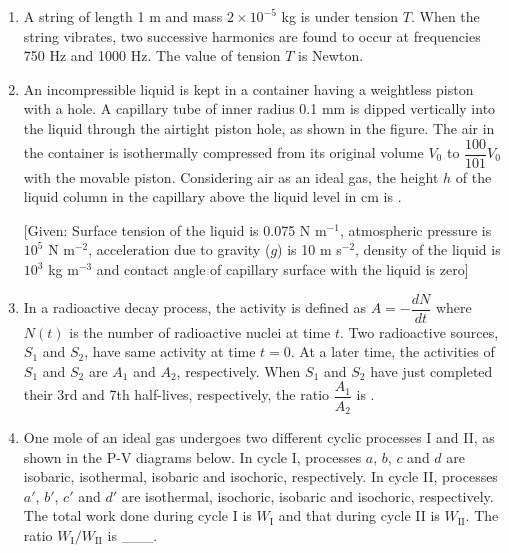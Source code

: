 \documentclass{article}
\renewcommand{\frac}[2]{\dfrac{#1}{#2}}
\begin{document}
\begin{enumerate}
    \item A string of length 1 m and mass \( 2 \times 10^{-5} \) kg is under tension \( T \). When the string vibrates, two successive harmonics are found to occur at frequencies 750 Hz and 1000 Hz. The value of tension \( T \) is \underline{\hspace{2cm}} Newton.
    \item An incompressible liquid is kept in a container having a weightless piston with a hole. A capillary tube of inner radius 0.1 mm is dipped vertically into the liquid through the airtight piston hole, as shown in the figure. The air in the container is isothermally compressed from its original volume \( V_0 \) to \( \frac{100}{101}V_0 \) with the movable piston. Considering air as an ideal gas, the height \( h \) of the liquid column in the capillary above the liquid level in cm is \underline{\hspace{2cm}}.

    \begin{center}
    \end{center}

    [Given: Surface tension of the liquid is 0.075 N m\(^{-1}\), atmospheric pressure is \( 10^5 \) N m\(^{-2}\), acceleration due to gravity (\( g \)) is 10 m s\(^{-2}\), density of the liquid is \( 10^3 \) kg m\(^{-3}\) and contact angle of capillary surface with the liquid is zero]
    \item In a radioactive decay process, the activity is defined as \( A = -\frac{dN}{dt} \) where \( N(t) \) is the number of radioactive nuclei at time \( t \). Two radioactive sources, \( S_1 \) and \( S_2 \), have same activity at time \( t = 0 \). At a later time, the activities of \( S_1 \) and \( S_2 \) are \( A_1 \) and \( A_2 \), respectively. When \( S_1 \) and \( S_2 \) have just completed their 3rd and 7th half-lives, respectively, the ratio \( \frac{A_1}{A_2} \) is \underline{\hspace{2cm}}.

    \item One mole of an ideal gas undergoes two different cyclic processes I and II, as shown in the P-V diagrams below. In cycle I, processes \(a\), \(b\), \(c\) and \(d\) are isobaric, isothermal, isobaric and isochoric, respectively. In cycle II, processes \(a'\), \(b'\), \(c'\) and \(d'\) are isothermal, isochoric, isobaric and isochoric, respectively. The total work done during cycle I is \(W_{\mathrm{I}}\) and that during cycle II is \(W_{\mathrm{II}}\). The ratio \(W_{\mathrm{I}}/W_{\mathrm{II}}\) is \_\_\_.
    

\end{enumerate}
\end{document}

